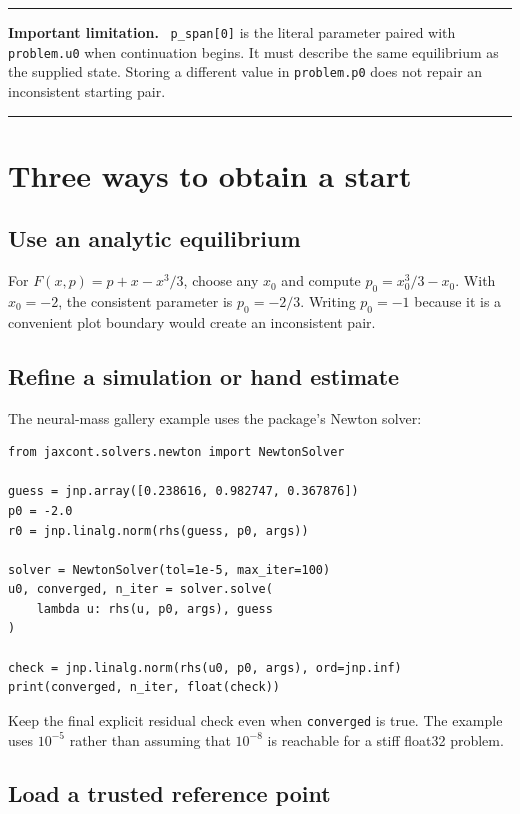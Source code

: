 \documentclass[11pt,oneside]{book}
\newenvironment{warningbox}
  {\par\medskip\noindent\begin{minipage}{\textwidth}
   \color{JaxRed}\rule{\textwidth}{0.8pt}\par
   \textbf{Important limitation.}\ \color{black}}
  {\par\color{JaxRed}\rule{\textwidth}{0.8pt}
   \end{minipage}\par\medskip}
\begin{document}
\begin{warningbox}
\texttt{p\_span[0]} is the literal parameter paired with
\texttt{problem.u0} when continuation begins. It must describe the same
equilibrium as the supplied state. Storing a different value in
\texttt{problem.p0} does not repair an inconsistent starting pair.
\end{warningbox}

\section{Three ways to obtain a start}

\subsection{Use an analytic equilibrium}

For $F(x,p)=p+x-x^3/3$, choose any $x_0$ and compute
$p_0=x_0^3/3-x_0$. With $x_0=-2$, the consistent parameter is
$p_0=-2/3$. Writing $p_0=-1$ because it is a convenient plot boundary would
create an inconsistent pair.

\subsection{Refine a simulation or hand estimate}

The neural-mass gallery example uses the package's Newton solver:

\begin{lstlisting}
from jaxcont.solvers.newton import NewtonSolver

guess = jnp.array([0.238616, 0.982747, 0.367876])
p0 = -2.0
r0 = jnp.linalg.norm(rhs(guess, p0, args))

solver = NewtonSolver(tol=1e-5, max_iter=100)
u0, converged, n_iter = solver.solve(
    lambda u: rhs(u, p0, args), guess
)

check = jnp.linalg.norm(rhs(u0, p0, args), ord=jnp.inf)
print(converged, n_iter, float(check))
\end{lstlisting}

Keep the final explicit residual check even when \texttt{converged} is true.
The example uses $10^{-5}$ rather than assuming that $10^{-8}$ is reachable
for a stiff float32 problem.

\subsection{Load a trusted reference point}
\end{document}
